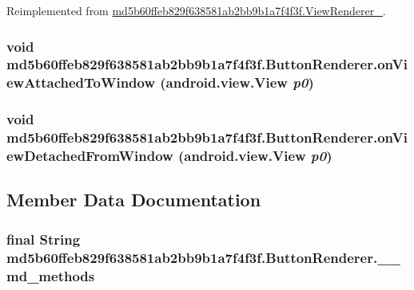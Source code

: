 Reimplemented from \hyperlink{classmd5b60ffeb829f638581ab2bb9b1a7f4f3f_1_1_view_renderer__2_0b758be41e41d3577cadf82bc8d004b6}{md5b60ffeb829f638581ab2bb9b1a7f4f3f.ViewRenderer\_}.\hypertarget{classmd5b60ffeb829f638581ab2bb9b1a7f4f3f_1_1_button_renderer_545cf2b3c92707d187a93a08903f63ec}{
\subsubsection[{onViewAttachedToWindow}]{\setlength{\rightskip}{0pt plus 5cm}void md5b60ffeb829f638581ab2bb9b1a7f4f3f.ButtonRenderer.onViewAttachedToWindow (android.view.View {\em p0})}}
\label{classmd5b60ffeb829f638581ab2bb9b1a7f4f3f_1_1_button_renderer_545cf2b3c92707d187a93a08903f63ec}


\hypertarget{classmd5b60ffeb829f638581ab2bb9b1a7f4f3f_1_1_button_renderer_ebd2e3c0410f099a12739d53789de61b}{
\subsubsection[{onViewDetachedFromWindow}]{\setlength{\rightskip}{0pt plus 5cm}void md5b60ffeb829f638581ab2bb9b1a7f4f3f.ButtonRenderer.onViewDetachedFromWindow (android.view.View {\em p0})}}
\label{classmd5b60ffeb829f638581ab2bb9b1a7f4f3f_1_1_button_renderer_ebd2e3c0410f099a12739d53789de61b}




\subsection{Member Data Documentation}
\hypertarget{classmd5b60ffeb829f638581ab2bb9b1a7f4f3f_1_1_button_renderer_9e989b257f85aa8a9f7b8ec7a324a423}{
\subsubsection[{\_\-\_\-md\_\-methods}]{\setlength{\rightskip}{0pt plus 5cm}final String {\bf md5b60ffeb829f638581ab2bb9b1a7f4f3f.ButtonRenderer.\_\-\_\-md\_\-methods}}}
\label{classmd5b60ffeb829f638581ab2bb9b1a7f4f3f_1_1_button_renderer_9e989b257f85aa8a9f7b8ec7a324a423}




